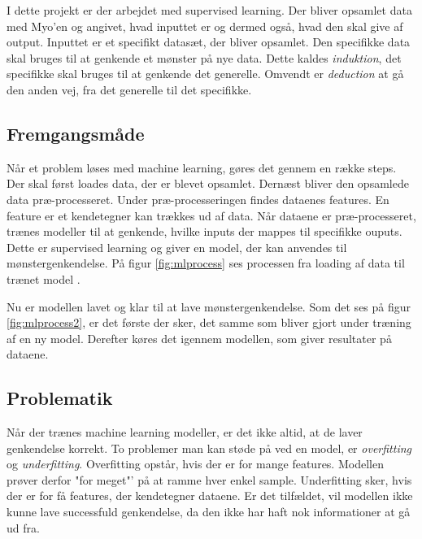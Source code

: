 I dette projekt er der arbejdet med supervised learning. Der bliver opsamlet data med Myo'en og angivet, hvad inputtet er og dermed også, hvad den skal give af output. Inputtet er et specifikt datasæt, der bliver opsamlet. Den specifikke data skal bruges til at genkende et mønster på nye data. Dette kaldes \textit{induktion}, det specifikke skal bruges til at genkende det generelle. Omvendt er \textit{deduction} at gå den anden vej, fra det generelle til det specifikke.

\subsection{Fremgangsmåde}
Når et problem løses med machine learning, gøres det gennem en række steps. Der skal først loades data, der er blevet opsamlet. Dernæst bliver den opsamlede data præ-processeret. Under præ-processeringen findes dataenes features. En feature er et kendetegner kan trækkes ud af data. Når dataene er præ-processeret, trænes modeller til at genkende, hvilke inputs der mappes til specifikke ouputs. Dette er supervised learning og giver en model, der kan anvendes til mønstergenkendelse. På figur \ref{fig:mlprocess} ses processen fra loading af data til trænet model \citep{MLMadeEasy}.


Nu er modellen lavet og klar til at lave mønstergenkendelse. Som det ses på figur \ref{fig:mlprocess2}, er det første der sker, det samme som bliver gjort under træning af en ny model. Derefter køres det igennem modellen, som giver resultater på dataene.


\subsection{Problematik}
Når der trænes machine learning modeller, er det ikke altid, at de laver genkendelse korrekt. To problemer man kan støde på ved en model, er \textit{overfitting} og \textit{underfitting}. Overfitting opstår, hvis der er for mange features. Modellen prøver derfor "for meget"' på at ramme hver enkel sample. Underfitting sker, hvis der er for få features, der kendetegner dataene. Er det tilfældet, vil modellen ikke kunne lave successfuld genkendelse, da den ikke har haft nok informationer at gå ud fra.

